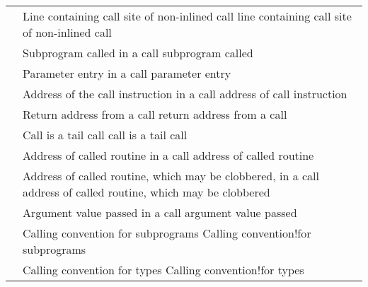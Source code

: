 \begin{longtable}{P{6.2cm}|P{8.5cm}}
&
           {Line containing call site of non-inlined call} 
           {line containing call site of non-inlined call} \\
\DWATcalloriginTARG{}
&
           {Subprogram called in a call}
           {subprogram called}
            \\
\DWATcallparameterTARG{}
&
           {Parameter entry in a call}
           {parameter entry}
            \\
\DWATcallpcTARG{}
&
           {Address of the call instruction in a call}
           {address of call instruction}
            \\
\DWATcallreturnpcTARG{}
&
           {Return address from a call}
           {return address from a call}
            \\
\DWATcalltailcallTARG{}
&
           {Call is a tail call}
           {call is a tail call}
            \\
\DWATcalltargetTARG{}
&
           {Address of called routine in a call}
           {address of called routine}
            \\
\DWATcalltargetclobberedTARG{}
&
           {Address of called routine, which may be clobbered, in a call}
           {address of called routine, which may be clobbered}
            \\
\DWATcallvalueTARG{}
&
           {Argument value passed in a call}
           {argument value passed}
            \\
\DWATcallingconventionTARG{} 
&
           {Calling convention for subprograms}
           {Calling convention!for subprograms} \\
&
           {Calling convention for types}
           {Calling convention!for types} \\

\end{longtable}
